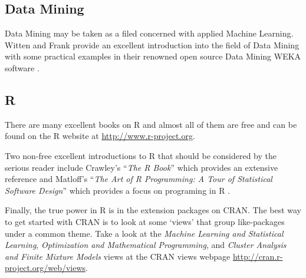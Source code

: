 \subsection{Data Mining}
Data Mining may be taken as a filed concerned with applied Machine Learning. 
Witten and Frank provide an excellent introduction into the field of Data Mining with some practical examples in their renowned open source Data Mining WEKA software \cite{Witten2011}.

\subsection{R}
There are many excellent books on R and almost all of them are free and can be found on the R website at \url{http://www.r-project.org}.

Two non-free excellent introductions to R that should be considered by the serious reader include Crawley's ``\emph{The R Book}'' which provides an extensive reference \cite{Crawley2007} and Matloff's ``\emph{The Art of R Programming: A Tour of Statistical Software Design}'' which provides a focus on programing in R \cite{Matloff2011}.

Finally, the true power in R is in the extension packages on CRAN. The best way to get started with CRAN is to look at some `views' that group like-packages under a common theme. Take a look at the \emph{Machine Learning and Statistical Learning}, \emph{Optimization and Mathematical Programming}, and \emph{Cluster Analysis and Finite Mixture Models} views at the CRAN views webpage \url{http://cran.r-project.org/web/views}.
